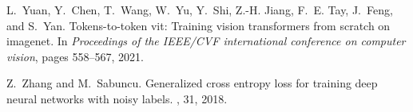\documentclass[11pt]{article}
\begin{document}
\begin{thebibliography}{10}
L.~Yuan, Y.~Chen, T.~Wang, W.~Yu, Y.~Shi, Z.-H. Jiang, F.~E. Tay, J.~Feng, and
  S.~Yan.
\newblock Tokens-to-token vit: Training vision transformers from scratch on
  imagenet.
\newblock In {\em Proceedings of the IEEE/CVF international conference on
  computer vision}, pages 558--567, 2021.

Z.~Zhang and M.~Sabuncu.
\newblock Generalized cross entropy loss for training deep neural networks with
  noisy labels.
, 31, 2018.

\end{thebibliography}
\end{document}
